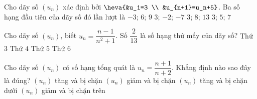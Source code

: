 \begin{ex}%
	Cho dãy  số $(u_n)$ xác định bởi
	$\heva{&u_1=3  \\
	&u_{n+1}=u_n+5}$. Ba số hạng đầu  tiên của dãy số đó lần lượt là
	\choice 
		 {$-3$; $6$; $9$}
		{$3$;  $-2$; $-7$}
		{\True $3$; $8$;  $13$}
		{$3$; $5$; $7$} 
\end{ex}

\begin{ex}%
	Cho dãy số $(u_n)$, biết $u_n=\dfrac{n-1}{n^2+1}$. Số $\dfrac{2}{13}$ là số hạng thứ mấy  của dãy số?
	 \choice
		{Thứ $3$} 
		{Thứ  $4$}
		{\True Thứ $5$} 
		 {Thứ $6$}
\end{ex}

\begin{ex}%
	Cho dãy số $(u_n)$ có  số hạng tổng quát là $u_n = \dfrac{n + 1}{n + 2}$. Khẳng định nào sao đây là đúng?
	\choice 
		{\True $(u_n)$  tăng và bị chặn}
		{$(u_n)$ giảm và  bị chặn}
		{$(u_n)$ tăng và  bị chặn dưới}
		{$(u_n)$  giảm và bị chặn trên}
\end{ex}

